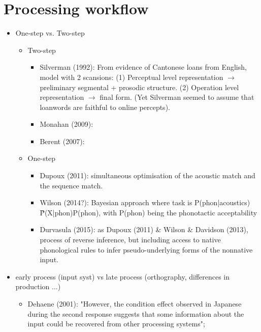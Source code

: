 {\section{Processing workflow}
\begin{itemize}
\item One-step vs. Two-step
  \begin{itemize}
  \item Two-step
      \begin{itemize}
        \item Silverman (1992): From evidence of Cantonese loans from English, model with 2 scansions: (1) Perceptual level representation $\rightarrow$ preliminary segmental + prosodic structure. (2) Operation level representation $\rightarrow$ final form. (Yet Silverman seemed to assume that loanwords are faithful to online percepts).
        \item Monahan (2009):
        \item Berent (2007): 
      \end{itemize}
  \item One-step
      \begin{itemize}
         \item Dupoux (2011): simultaneous optimisation of the acoustic match and the sequence match.
         \item Wilson (2014?): Bayesian approach where task is P(phon|acoustics) \~ P(X|phon)P(phon), with P(phon) being the phonotactic acceptability 
         \item Durvasula (2015): as Dupoux (2011) \& Wilson \& Davidson (2013), process of reverse inference, but including access to native phonological rules to infer pseudo-underlying forms of the nonnative input.
      \end{itemize}  
  \end{itemize}
\item early process (input syst) vs late process (orthography, differences in production ...)
  \begin{itemize}
     \item Dehaene (2001): "However, the condition effect observed in Japanese during the second response suggests that some information about the input could be recovered from other processing systems";
  \end{itemize}  
\end{itemize}
}



